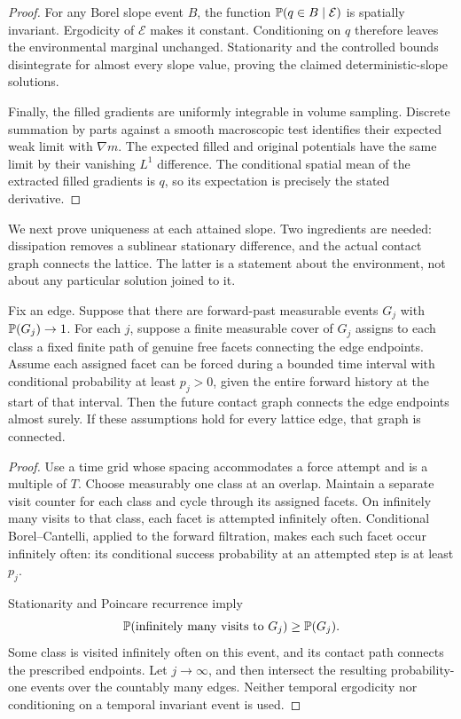 \begin{proof}
For any Borel slope event $B$, the function
$\mathbb P(q\in B\mid\mathcal E)$ is spatially invariant. Ergodicity of
$\mathcal E$ makes it constant. Conditioning on $q$ therefore leaves
the environmental marginal unchanged. Stationarity and the controlled
bounds disintegrate for almost every slope value, proving the claimed
deterministic-slope solutions.

Finally, the filled gradients are uniformly integrable in volume sampling.
Discrete summation by parts against a smooth macroscopic test identifies
their expected weak limit with $\nabla m$. The expected filled and original
potentials have the same limit by their vanishing $L^1$ difference.
The conditional spatial mean of the extracted filled gradients is $q$,
so its expectation is precisely the stated derivative.
\end{proof}

We next prove uniqueness at each attained slope. Two ingredients are
needed: dissipation removes a sublinear stationary difference, and the
actual contact graph connects the lattice. The latter is a statement about
the environment, not about any particular solution joined to it.

\begin{lemma}\label{b:recurrence}
Fix an edge. Suppose that there are forward-past measurable events $G_j$
with $\mathbb P(G_j)\to1$. For each $j$, suppose a finite measurable cover of
$G_j$ assigns to each class a fixed finite path of genuine free facets
connecting the edge endpoints. Assume each assigned facet can be forced
during a bounded time interval with conditional probability at least
$p_j>0$, given the entire forward history at the start of that interval.
Then the future contact graph connects the edge endpoints almost surely.
If these assumptions hold for every lattice edge, that graph is connected.
\end{lemma}

\begin{proof}
Use a time grid whose spacing accommodates a force attempt and is a
multiple of $T$. Choose measurably one class at an overlap. Maintain a
separate visit counter for each class and cycle through its assigned
facets. On infinitely many visits to that class, each facet is attempted
infinitely often. Conditional Borel--Cantelli, applied to the forward
filtration, makes each such facet occur infinitely often: its conditional
success probability at an attempted step is at least $p_j$.

Stationarity and Poincare recurrence imply
\[
 \mathbb P(\text{infinitely many visits to }G_j)\ge\mathbb P(G_j).
\]
Some class is visited infinitely often on this event, and its contact
path connects the prescribed endpoints. Let $j\to\infty$, and then
intersect the resulting probability-one events over the countably many
edges. Neither temporal ergodicity nor conditioning on a temporal
invariant event is used.
\end{proof}

